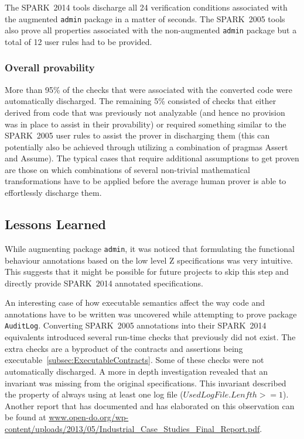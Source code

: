 \documentclass[10pt,a4paper,twocolumn]{article}
\newcommand{\oldspark}{SPARK~2005\xspace}
\newcommand{\newspark}{SPARK~2014\xspace}
\newcommand{\SPARK}[1]{\lstinline[language=Ada,basicstyle={\footnotesize
      \sffamily},framesep=0pt]$#1$}
\begin{document}
The \newspark tools discharge all 24 verification conditions
associated with the augmented \SPARK{admin} package in a matter of
seconds. The \oldspark tools also prove all properties associated with
the non-augmented \SPARK{admin} package but a total of 12 user rules had
to be provided.

\subsubsection{Overall provability}

More than 95\% of the checks that were associated with the converted
code were automatically discharged. The remaining 5\% consisted of
checks that either derived from code that was previously not
analyzable (and hence no provision was in place to assist in their
provability) or required something similar to the \oldspark user rules
to assist the prover in discharging them (this can potentially also be
achieved through utilizing a combination of pragmas Assert and
Assume). The typical cases that require additional assumptions to get
proven are those on which combinations of several non-trivial
mathematical transformations have to be applied before the average
human prover is able to effortlessly discharge them.

\subsection{Lessons Learned}

While augmenting package \SPARK{admin}, it was noticed that formulating
the functional behaviour annotations based on the low level Z
specifications was very intuitive. This suggests that it might be
possible for future projects to skip this step and directly provide
\newspark annotated specifications.

An interesting case of how executable semantics affect the way code
and annotations have to be written was uncovered while attempting to
prove package \SPARK{AuditLog}. Converting \oldspark annotations into
their \newspark equivalents introduced several run-time checks that
previously did not exist. The extra checks are a byproduct of the
contracts and assertions being
executable~\ref{subsec:ExecutableContracts}. Some of these checks were
not automatically discharged. A more in depth investigation revealed
that an invariant was missing from the original specifications. This
invariant described the property of always using at least one log file
($UsedLogFile.Lenfth >= 1$). Another report that has documented and
has elaborated on this observation can be found at
\url{www.open-do.org/wp-content/uploads/2013/05/Industrial_Case_Studies_Final_Report.pdf}.
\end{document}
